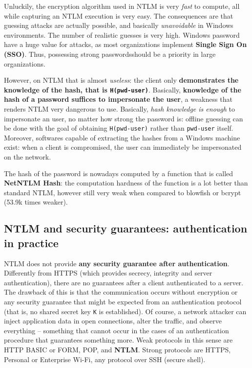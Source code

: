 \documentclass[10pt]{extbook}
\begin{document}
Unluckily, the encryption algorithm used in NTLM is very \emph{fast} to
compute, all while capturing an NTLM execution is very easy. The consequences
are that guessing attacks are actually possible, and basically
\emph{unavoidable} in Windows environments. The number of realistic guesses is
very high. Windows password have a huge value for attacks, as most
organizations implement \textbf{Single Sign On (SSO)}. Thus, possessing strong
passwordsshould be a priority in large organizations.

However, on NTLM that is almost \emph{useless}: the client only
\textbf{demonstrates the knowledge of the hash, that is \texttt{H(pwd-user)}}.
Basically, \textbf{knowledge of the hash of a password suffices to impersonate
the user}, a weakness that renders NTLM very dangerous to use. Basically,
\emph{hash knowledge is enough} to impersonate an user, no matter how strong
the password is: offline guessing can be done with the goal of obtaining
\texttt{H(pwd-user)} rather than \texttt{pwd-user} itself. Moreover, softwares
capable of extracting the hashes from a Windows machine exist: when a client is
compromised, the user can immediately be impersonated on the network.

The hash of the password is nowadays computed by a function that is called
\textbf{NetNTLM Hash}: the computation hardness of the function is a lot better
than standard NTLM, however still very weak when compared to blowfish or bcrypt
(53.9k times weaker).

\subsection{NTLM and security guarantees: authentication in practice}

NTLM does not provide \textbf{any security guarantee after authentication}.
Differently from HTTPS (which provides secrecy, integrity and server
authentication), there are no guarantees after a client authenticated to a
server. The drawback of this is that the communication occurs without
encryption or any security guarantee that might be expected from an
authentication protocol (that is, no shared secret key \texttt{K} is
established). Of course, a network attacker can inject application data in open
connections, alter the traffic, and observe everything -- something that cannot
occur in the cases of an authentication procedure that guarantees something
more. Weak protocols in this sense are HTTP BASIC or FORM, POP, and
\textbf{NTLM}. Strong protocols are HTTPS, Personal or Enterprise Wi\--Fi, any
protocol over SSH (secure shell).
\end{document}
